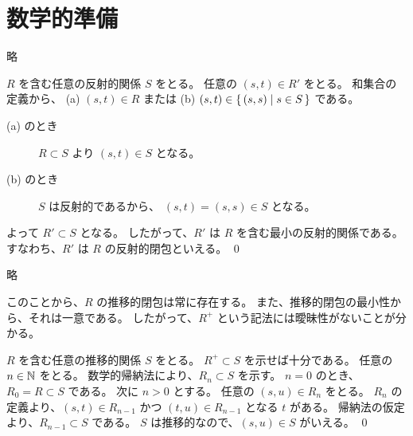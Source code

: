 \chapter{数学的準備}

\begin{jexercise*}[2.2.6]
  略
\end{jexercise*}
\begin{jproof}
  $R$ を含む任意の反射的関係 $S$ をとる。
  任意の $(s, t) \in R'$ をとる。
  和集合の定義から、
    (a) $(s, t) \in R$ または
    (b) $(s, t) \in \{\,(s, s) \mid s \in S\,\}$
    である。
  \begin{description}
    \item[(a) のとき]
      $R \subset S$ より $(s, t) \in S$ となる。
    \item[(b) のとき]
      $S$ は反射的であるから、 $(s, t) = (s, s) \in S$ となる。
  \end{description}
  よって $R' \subset S$ となる。
  したがって、$R'$ は $R$ を含む最小の反射的関係である。
  すなわち、$R'$ は $R$ の反射的閉包といえる。
  \qed
\end{jproof}

\begin{jexercise*}[2.2.7]
  \label{演習2.2.7.}
  略
\end{jexercise*}
\begin{jremark*}
  このことから、$R$ の推移的閉包は常に存在する。
  また、推移的閉包の最小性から、それは一意である。
  したがって、$R^+$ という記法には曖昧性がないことが分かる。
\end{jremark*}
\begin{jproof}
  $R$ を含む任意の推移的関係 $S$ をとる。
  $R^+ \subset S$ を示せば十分である。
  任意の $n \in \mathbb{N}$ をとる。
  数学的帰納法により、$R_n \subset S$ を示す。
  $n = 0$ のとき、$R_0 = R \subset S$ である。
  次に $n > 0$ とする。
  任意の $(s, u) \in R_n$ をとる。
  $R_n$ の定義より、$(s, t) \in R_{n - 1}$ かつ $(t, u) \in R_{n - 1}$ となる $t$ がある。
  帰納法の仮定より、$R_{n - 1} \subset S$ である。
  $S$ は推移的なので、$(s, u) \in S$ がいえる。
  \qed
\end{jproof}
